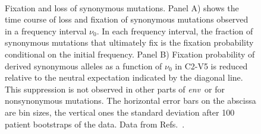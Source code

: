 \documentclass[rmp, twocolumn]{revtex4}
\newcommand{\env}{\textit{env}}
\begin{document}
\begin{figure}
\begin{center}
\\
\caption{Fixation and loss of synonymous mutations.
Panel A) shows the time
course of loss and fixation of synonymous mutations observed in a frequency interval $\nu_0$. 
In each frequency interval, the  fraction of synonymous
mutations that ultimately fix is the fixation probability conditional on the
initial frequency.
Panel B) Fixation probability of derived synonymous
alleles as a function of $\nu_0$ in C2-V5 is reduced relative to the neutral
expectation indicated by the diagonal line. This suppression is not
observed in other parts of \env~or for nonsynonymous mutations.
The horizontal error bars on the abscissa are bin sizes, the vertical ones the
standard deviation after 100 patient bootstraps of the data. Data from
Refs.~\cite{shankarappa_consistent_1999,liu_selection_2006, bunnik_autologous_2008}.}
\label{fig:fixp}
\end{center}
\end{figure}
\end{document}
